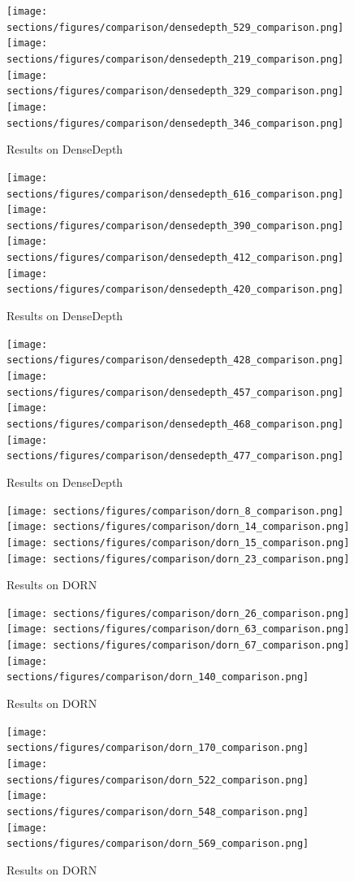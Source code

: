 \documentclass[10pt,letterpaper]{article}
\begin{document}
\begin{figure}
  \texttt{[image: sections/figures/comparison/densedepth\_529\_comparison.png]}
  \texttt{[image: sections/figures/comparison/densedepth\_219\_comparison.png]}
  \texttt{[image: sections/figures/comparison/densedepth\_329\_comparison.png]}
  \texttt{[image: sections/figures/comparison/densedepth\_346\_comparison.png]}
  \caption{Results on DenseDepth}
\end{figure}
\begin{figure}
  \texttt{[image: sections/figures/comparison/densedepth\_616\_comparison.png]}
  \texttt{[image: sections/figures/comparison/densedepth\_390\_comparison.png]}
  \texttt{[image: sections/figures/comparison/densedepth\_412\_comparison.png]}
  \texttt{[image: sections/figures/comparison/densedepth\_420\_comparison.png]}
  \caption{Results on DenseDepth}
\end{figure}
\begin{figure}
  \texttt{[image: sections/figures/comparison/densedepth\_428\_comparison.png]}
  \texttt{[image: sections/figures/comparison/densedepth\_457\_comparison.png]}
  \texttt{[image: sections/figures/comparison/densedepth\_468\_comparison.png]}
  \texttt{[image: sections/figures/comparison/densedepth\_477\_comparison.png]}
  \caption{Results on DenseDepth}
\end{figure}
\begin{figure}
  \texttt{[image: sections/figures/comparison/dorn\_8\_comparison.png]}
  \texttt{[image: sections/figures/comparison/dorn\_14\_comparison.png]}
  \texttt{[image: sections/figures/comparison/dorn\_15\_comparison.png]}
  \texttt{[image: sections/figures/comparison/dorn\_23\_comparison.png]}
  \caption{Results on DORN}
\end{figure}
\begin{figure}
  \texttt{[image: sections/figures/comparison/dorn\_26\_comparison.png]}
  \texttt{[image: sections/figures/comparison/dorn\_63\_comparison.png]}
  \texttt{[image: sections/figures/comparison/dorn\_67\_comparison.png]}
  \texttt{[image: sections/figures/comparison/dorn\_140\_comparison.png]}
  \caption{Results on DORN}
\end{figure}
\begin{figure}
  \texttt{[image: sections/figures/comparison/dorn\_170\_comparison.png]}
  \texttt{[image: sections/figures/comparison/dorn\_522\_comparison.png]}
  \texttt{[image: sections/figures/comparison/dorn\_548\_comparison.png]}
  \texttt{[image: sections/figures/comparison/dorn\_569\_comparison.png]}
  \caption{Results on DORN}
\end{figure}
\end{document}
